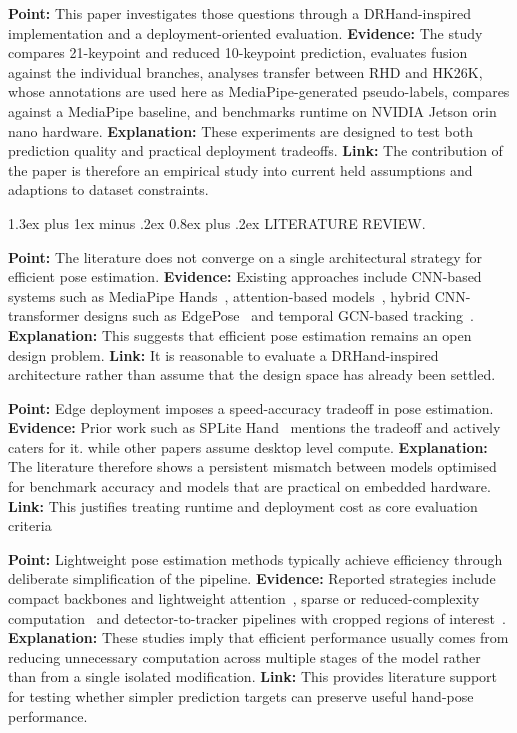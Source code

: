 \documentclass[10pt,letterpaper]{article}
\makeatletter
\renewcommand\section{\@startsection{section}{1}{\z@}%
  {1.3ex plus 1ex minus .2ex}%
  {0.8ex plus .2ex}%
  {\centering\normalfont\small\scshape}}
\makeatother
\begin{document}
\medskip
\noindent\textbf{Point:} This paper investigates those questions through a DRHand-inspired implementation and a deployment-oriented evaluation.
\textbf{Evidence:} The study compares 21-keypoint and reduced 10-keypoint prediction, evaluates fusion against the individual branches, analyses transfer between RHD and HK26K, whose annotations are used here as MediaPipe-generated pseudo-labels, compares against a MediaPipe baseline, and benchmarks runtime on NVIDIA Jetson orin nano hardware.
\textbf{Explanation:} These experiments are designed to test both prediction quality and practical deployment tradeoffs.
\textbf{Link:} The contribution of the paper is therefore an empirical study into current held assumptions and adaptions to dataset constraints.

\section{LITERATURE REVIEW}.

\medskip
\noindent\textbf{Point:} The literature does not converge on a single architectural strategy for efficient pose estimation.  
\textbf{Evidence:} Existing approaches include CNN-based systems such as MediaPipe Hands~\cite{mediapipe}, attention-based models~\cite{attentionlite}, hybrid CNN-transformer designs such as EdgePose~\cite{edgepose} and temporal GCN-based tracking~\cite{handobjectgcn}.  
\textbf{Explanation:} This suggests that efficient pose estimation remains an open design problem.  
\textbf{Link:} It is reasonable to evaluate a DRHand-inspired architecture rather than assume that the design space has already been settled.

\medskip
\noindent\textbf{Point:} Edge deployment imposes a speed-accuracy tradeoff in pose estimation.  
\textbf{Evidence:} Prior work such as SPLite Hand~\cite{splitehand} mentions the tradeoff and actively caters for it. while other papers assume desktop level compute.
\textbf{Explanation:} The literature therefore shows a persistent mismatch between models optimised for benchmark accuracy and models that are practical on embedded hardware.  
\textbf{Link:} This justifies treating runtime and deployment cost as core evaluation criteria

\medskip
\noindent\textbf{Point:} Lightweight pose estimation methods typically achieve efficiency through deliberate simplification of the pipeline.  
\textbf{Evidence:} Reported strategies include compact backbones and lightweight attention~\cite{attentionlite}, sparse or reduced-complexity computation~\cite{splitehand} and detector-to-tracker pipelines with cropped regions of interest~\cite{mediapipe}.  
\textbf{Explanation:} These studies imply that efficient performance usually comes from reducing unnecessary computation across multiple stages of the model rather than from a single isolated modification.  
\textbf{Link:} This provides literature support for testing whether simpler prediction targets can preserve useful hand-pose performance.
\end{document}
